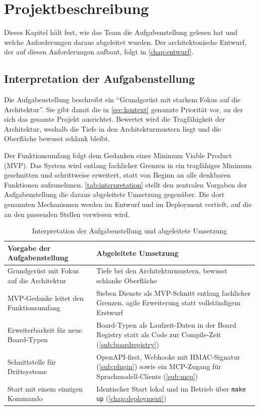 \chapter{Projektbeschreibung}
\label{chap:projektbeschreibung}

Dieses Kapitel hält fest, wie das Team die Aufgabenstellung gelesen hat und welche Anforderungen daraus abgeleitet wurden. Der architektonische Entwurf, der auf diesen Anforderungen aufbaut, folgt in \vref{chap:entwurf}.

\section{Interpretation der Aufgabenstellung}
\label{sec:interpretation}

Die Aufgabenstellung beschreibt ein \enquote{Grundgerüst mit starkem Fokus auf die Architektur}. Sie gibt damit die in \vref{sec:kontext} genannte Priorität vor, an der sich das gesamte Projekt ausrichtet. Bewertet wird die Tragfähigkeit der Architektur, weshalb die Tiefe in den Architekturmustern liegt und die Oberfläche bewusst schlank bleibt.

Der Funktionsumfang folgt dem Gedanken eines Minimum Viable Product (MVP). Das System wird entlang fachlicher Grenzen in ein tragfähiges Minimum geschnitten und schrittweise erweitert, statt von Beginn an alle denkbaren Funktionen aufzunehmen. \vref{tab:interpretation} stellt den zentralen Vorgaben der Aufgabenstellung die daraus abgeleitete Umsetzung gegenüber. Die dort genannten Mechanismen werden im Entwurf und im Deployment vertieft, auf die an den passenden Stellen verwiesen wird.

\begin{table}[ht]
  \centering
  \caption{Interpretation der Aufgabenstellung und abgeleitete Umsetzung}
  \label{tab:interpretation}
  \begin{tabularx}{\linewidth}{@{}>{\raggedright\arraybackslash}p{5.0cm}X@{}}
    \toprule
    \textbf{Vorgabe der Aufgabenstellung} & \textbf{Abgeleitete Umsetzung} \\
    \midrule
    Grundgerüst mit Fokus auf die Architektur & Tiefe bei den Architekturmustern, bewusst schlanke Oberfläche \\
    MVP-Gedanke leitet den Funktionsumfang     & Sieben Dienste als MVP-Schnitt entlang fachlicher Grenzen, agile Erweiterung statt vollständigem Erstwurf \\
    Erweiterbarkeit für neue Board-Typen       & Board-Typen als Laufzeit-Daten in der Board Registry statt als Code zur Compile-Zeit (\vref{sub:boardregistry}) \\
    Schnittstelle für Drittsysteme             & OpenAPI-first, Webhooks mit HMAC-Signatur (\vref{sub:plugin}) sowie ein MCP-Zugang für Sprachmodell-Clients (\vref{sub:mcp}) \\
    Start mit einem einzigen Kommando          & Identischer Start lokal und im Betrieb über \texttt{make up} (\vref{chap:deployment}) \\
    \bottomrule
  \end{tabularx}
\end{table}

